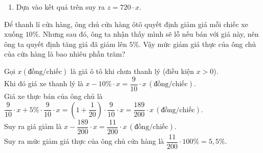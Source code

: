 \begin{bt}
{\begin{enumerate}
\begin{center}
\begin{tabular}{|c|c|c|c|c|c|}
	 		\hline
	 		${\hskip 0.2 cm}y{\hskip 0.2 cm}$& ${\hskip 0.3 cm}{ 12}{\hskip 0.3 cm}$ & ${\hskip 0.3 cm}{1}{\hskip 0.3 cm}$ & ${\hskip 0.3 cm}{\dfrac{1}{60}}{\hskip 0.3 cm}$& ${\hskip 0.3cm}{\dfrac{1}{120}}{\hskip 0.3 cm}$& ${\hskip 0.3 cm}{\dfrac{1}{12} }{\hskip 0.3 cm}$\\
	 		\hline
	 		${\hskip 0.2 cm}z{\hskip 0.2 cm}$& ${\hskip 0.3 cm}{720}{\hskip 0.3 cm}$ & ${\hskip 0.3 cm}{60}{\hskip 0.3 cm}$ & ${\hskip 0.3 cm}{1}{\hskip 0.3 cm}$ & ${\hskip 0.3 cm}{ 0{,}5 }{\hskip 0.3 cm}$& ${\hskip 0.3 cm}{ 5}{\hskip 0.3 cm}$\\
	 		\hline
	 	\end{tabular}
	 \end{center}
	\item  Dựa vào kết quả trên suy ra $z = 720\cdot x$.
\end{enumerate}
	
}
\end{bt}


\begin{bt}%
Để thanh lí cửa hàng, ông chủ cửa hàng ôtô quyết định giảm giá mỗi chiếc xe xuống $10\%$. Nhưng sau đó, ông ta nhận thấy mình sẽ lỗ nếu bán với giá này, nên ông ta quyết định tăng giá đã giảm lên $5\%$. Vậy mức giảm giá thực của ông chủ của cửa hàng là bao nhiêu phần trăm?
	\loigiai 
	{Gọi $x (\mathrm{\text{đồng}}/\mathrm{\text{chiếc}})$ là giá ô tô khi chưa thanh lý (điều kiện $x > 0$).\\
	 Khi đó giá xe thanh lý là $x - 10\%\cdot x = \dfrac{9}{10}\cdot x\, (\mathrm{\text{đồng}}/\mathrm{\text{chiếc}}).$\\
	Giá xe thực bán của ông chủ là $\dfrac{9}{10}\cdot x + 5\%\cdot \dfrac{9}{10}\cdot x = \left(1 + \dfrac{1}{20}\right)\cdot\dfrac{9}{10}\cdot x = \dfrac{189}{200}\cdot x\, (\mathrm{\text{đồng}}/\mathrm{\text{chiếc}})$.\\
	Suy ra giá giảm là  $x - \dfrac{189}{200}\cdot x = \dfrac{11}{200}\cdot x\, (\mathrm{\text{đồng}}/\mathrm{\text{chiếc}})$.\\
Suy ra mức giảm giá thực của ông chủ cửa hàng là $\dfrac{11}{200}\cdot 100\% = 5{,}5\%$.  
		
	}
\end{bt}

